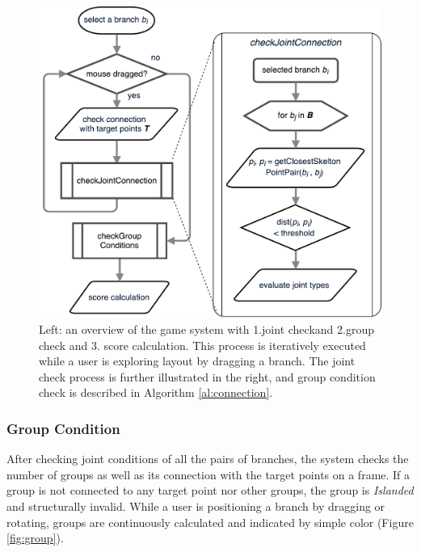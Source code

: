\begin{figure}[ht]
	\begin{center}
		\includegraphics[width = 0.35\paperwidth]{images/system/closestPointAlgorithm.pdf}
		\caption{Left: an overview of the game system with 1.joint checkand 2.group check and 3. score calculation. This process is iteratively executed while a user is exploring layout by dragging a branch. The joint check process is further illustrated in the right, and group condition check is described in Algorithm \ref{al:connection}. }
		\label{fig:system_flowchart}
	\end{center}
\end{figure}




\subsubsection*{Group Condition}

After checking joint conditions of all the pairs of branches, the system checks the number of groups as well as its connection with the target points on a frame.
If a group is not connected to any target point nor other groups, the group is \textit{Islanded} and structurally invalid.
While a user is positioning a branch by dragging or rotating, groups are continuously calculated and indicated by simple color (Figure \ref{fig:group}).

